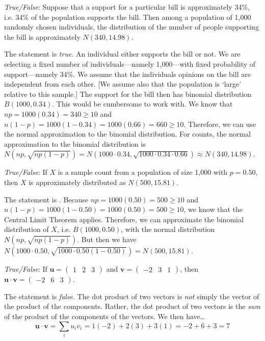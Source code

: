 \documentclass[11pt,letterpaper]{article}
\begin{document}
\quizsol \textit{True/False}: Suppose that a support for a particular bill is approximately 34\%, i.e. 34\% of the population supports the bill. Then among a population of 1,000 randomly chosen individuals, the distribution of the number of people supporting the bill is approximately $N(340, 14.98)$. \pspace

\sol The statement is \textit{true}. An individual either supports the bill or not. We are selecting a fixed number of individuals---namely 1,000---with fixed probability of support---namely 34\%. We assume that the individuals opinions on the bill are independent from each other. [We assume also that the population is `large' relative to this sample.] The support for the bill then has binomial distribution $B(1000, 0.34)$. This would be cumbersome to work with. We know that $np= 1000(0.34)= 340 \geq 10$ and $n(1 - p)= 1000(1 - 0.34)= 1000(0.66)= 660 \geq 10$. Therefore, we can use the normal approximation to the binomial distribution. For counts, the normal approximation to the binomial distribution is $N(np, \sqrt{np(1 - p)})= N(1000 \cdot 0.34, \sqrt{1000 \cdot 0.34 \cdot 0.66}) \approx N(340, 14.98)$. \pvspace{1.5cm}



\quizsol \textit{True/False}: If $X$ is a sample count from a population of size 1,000 with $p= 0.50$, then $X$ is approximately distributed as $N(500, 15.81)$. \pspace

\sol The statement is . Because $np= 1000(0.50)= 500 \geq 10$ and $n(1 - p)= 1000(1 - 0.50)= 1000 (0.50)= 500 \geq 10$, we know that the Central Limit Theorem applies. Therefore, we can approximate the binomial distribution of $X$, i.e. $B(1000,0.50)$, with the normal distribution $N(np, \sqrt{np(1 - p)})$. But then we have $N(1000 \cdot 0.50, \sqrt{1000 \cdot 0.50 (1 - 0.50)})= N(500, 15.81)$. \pvspace{1.5cm}



\quizsol \textit{True/False}: If $\mathbf{u}= \begin{pmatrix} 1 & 2 & 3 \end{pmatrix}$ and $\mathbf{v}= \begin{pmatrix} -2 & 3 & 1 \end{pmatrix}$, then $\mathbf{u} \cdot \mathbf{v}= \begin{pmatrix} -2 & 6 & 3 \end{pmatrix}$. \pspace

\sol The statement is \textit{false}. The dot product of two vectors is \textit{not} simply the vector of the product of the components. Rather, the dot product of two vectors is the \textit{sum} of the product of the components of the vectors. We then have\dots
	\[
	\mathbf{u} \cdot \mathbf{v}= \sum_i u_i v_i= 1(-2) + 2(3) + 3(1)= -2 + 6 + 3= 7 
	\]
\end{document}
